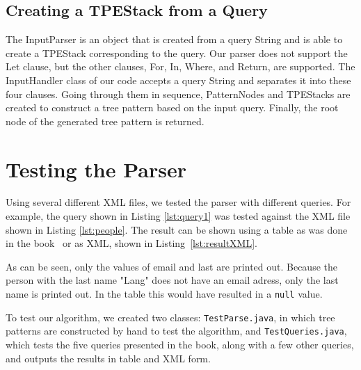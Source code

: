 \documentclass[11pt]{article}
\begin{document}
\subsection{Creating a TPEStack from a Query}
The InputParser is an object that is created from a query String and is able to create a TPEStack corresponding to the query. Our parser does not support the Let clause, but the other clauses, For, In, Where, and Return, are supported. The InputHandler class of our code accepts a query String and separates it into these four clauses. Going through them in sequence, PatternNodes and TPEStacks are created to construct a tree pattern based on the input query. Finally, the root node of the generated tree pattern is returned.

\section{Testing the Parser}
Using several different XML files, we tested the parser with different queries. For example, the query shown in Listing \ref{lst:query1} was tested against the XML file shown in Listing \ref{lst:people}. The result can be shown using a table as was done in the book~\cite{abiteboul2012web} or as XML, shown in Listing~\ref{lst:resultXML}.



As can be seen, only the values of email and last are printed out. Because the person with the last name "Lang" does not have an email adress, only the last name is printed out. In the table this would have resulted in a \lstinline{null} value. 

To test our algorithm, we created two classes: \lstinline{TestParse.java}, in which tree patterns are constructed by hand to test the algorithm, and \lstinline{TestQueries.java}, which tests the five queries presented in the book, along with a few other queries, and outputs the results in table and XML form.
\end{document}
